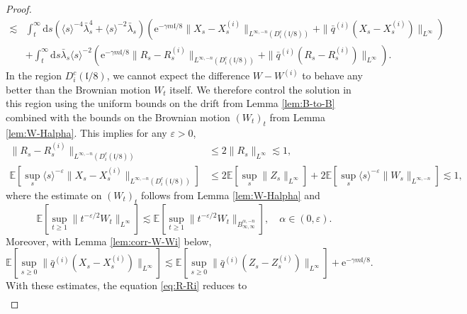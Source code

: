 \documentclass[11pt, a4paper]{scrartcl}
\numberwithin{equation}{section}
\theoremstyle{plain}
\theoremstyle{remark}
\newcommand{\mathd}{\mathrm{d}}
\newcommand{\mathe}{\mathrm{e}}
\newcommand{\nosymbol}{}
\begin{document}
\begin{proof}
\begin{equation}
\begin{aligned}
			\lesssim & \int_t^{\infty} \mathd s (\langle s \rangle^{- 4} \bar{\lambda}_s^4
			+ \langle s \rangle^{- 2} \bar{\lambda}_s) (\mathe^{- \gamma m\mathfrak{l}/ 8}
			\| X_s - X_s^{(i)} \|_{L^{\infty, - n} (D_i^c (\mathfrak{l}/ 8))} + \|
			\bar{q}^{(i)} (X_s - X_s^{(i)}) \|_{L^{\infty}})                               \\
			         & + \int_t^{\infty} \mathd s \bar{\lambda}_s \langle s \rangle^{- 2}
			(\mathe^{- \gamma m\mathfrak{l}/ 8} \| R_s - R_s^{(i)} \|_{L^{\infty, -
							n} (D_i^c (\mathfrak{l}/ 8))} + \| \bar{q}^{(i)} (R_s - R_s^{(i)})
			\|_{L^{\infty}}) .
		\end{aligned} \label{eq:R-Ri}
	\end{equation}
	In the region $D_i^c (\mathfrak{l}/ 8)$, we cannot expect the difference $W
		- W^{(i)}$ to behave any better than the Brownian motion $W_t$ itself. We
	therefore control the solution in this region using the uniform bounds on
	the drift from Lemma \ref{lem:B-to-B} combined with the bounds on the
	Brownian motion $(W_t)_t$ from Lemma \ref{lem:W-Halpha}. This implies for
	any $\varepsilon > 0$,
	\[ \begin{aligned}
			\| R_s - R_s^{(i)} \|_{L^{\infty, - n} (D_i^c (\mathfrak{l}/ 8))} &
			\leqslant  2\| R_s \|_{L^{\infty}} \lesssim 1,                                \\
			\mathbb{E} [\sup_s  \langle s \rangle^{- \varepsilon} \| X_s -
				X_s^{(i)} \|_{L^{\infty, - n} (D_i^c (\mathfrak{l}/ 8))}]
			                                                                  & \leqslant
			2\mathbb{E} [\sup_s \| Z_s \|_{L^{\infty}}] + 2\mathbb{E} [\sup_s
				\langle s \rangle^{- \varepsilon} \| W_s \|_{L^{\infty, - n}}] \lesssim
			1,
		\end{aligned} \]
	where the estimate on $(W_t)_t$ follows from Lemma \ref{lem:W-Halpha} and
	\[ \mathbb{E} \left[\sup_{t \geqslant 1} \| t^{- \varepsilon / 2} W_t
			\|^{\nosymbol}_{L^{\infty}}\right] \lesssim \mathbb{E} \left[\sup_{t \geqslant 1}
			\| t^{- \varepsilon / 2} W_t \|^{\nosymbol}_{B_{\infty, \infty}^{\alpha,
							- n}}\right], \quad \text{} \alpha \in (0, \varepsilon) . \]
	Moreover, with Lemma \ref{lem:corr-W-Wi} below,
	\[ \mathbb{E} \left[\sup_{s \geqslant 0} \| \bar{q}^{(i)} (X_s - X_s^{(i)})
			\|_{L^{\infty}}\right] \lesssim \mathbb{E} \left[\sup_{s \geqslant 0} \|
			\bar{q}^{(i)} (Z_s - Z_s^{(i)}) \|_{L^{\infty}}\right] + \mathe^{- \gamma
			m\mathfrak{l}/ 8} . \]
	With these estimates, the equation \eqref{eq:R-Ri} reduces to
	\[ \begin{aligned}

\end{aligned}\]
\end{proof}
\end{document}
